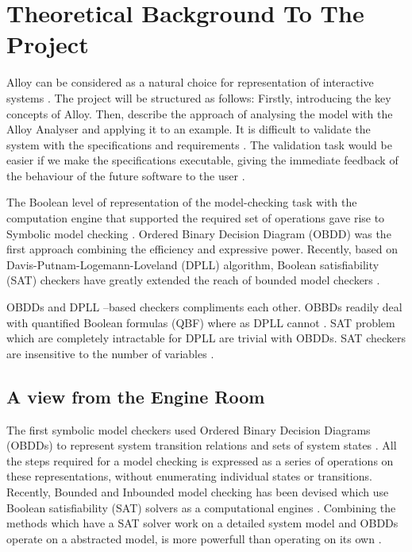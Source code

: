 \documentclass[a4paper,10pt]{report}
\begin{document}
\chapter{Theoretical Background To The Project}
Alloy can be considered as a natural choice for representation of interactive systems \cite{P.Curson}.  The project will be structured as follows:
 Firstly, introducing the key concepts of Alloy. Then, describe the approach of analysing the model with the Alloy Analyser and applying it to an example.
It is difficult to validate the system with the specifications and requirements \cite{Boyatt}. The     validation task would be easier if we make the specifications executable, giving the immediate feedback of the behaviour of the future software to the user \cite{Boyatt}.

The Boolean level of representation of the model-checking task with the computation engine that supported the required set of operations gave rise to Symbolic model checking \cite{Bryant1986}. Ordered Binary Decision Diagram (OBDD) was the first approach combining the efficiency and expressive power. Recently, based on Davis-Putnam-Logemann-Loveland (DPLL) algorithm, Boolean satisfiability (SAT) checkers have greatly extended the reach of bounded model checkers \cite{Bryant1986}.

OBDDs and DPLL –based checkers compliments each other. OBBDs readily deal with quantified Boolean formulas (QBF) where as DPLL cannot \cite{Bryant1986}. SAT problem which are completely intractable for DPLL are trivial with OBDDs. SAT checkers are insensitive to the number of variables \cite{Strichman}.

\section{A view from the Engine Room}
\label{View from engine}

The first symbolic model checkers used Ordered Binary Decision Diagrams (OBDDs) \cite{Bryant1986} to represent system transition relations and sets of system states \cite{McMillan1992} . All the steps required for a model checking is expressed as a series of operations on these representations, without enumerating individual states or transitions. Recently, Bounded and Inbounded model checking has been devised which use Boolean satisfiability (SAT) solvers as a computational engines \cite{McMillan1992}. Combining the methods which have a SAT solver work on a detailed system model and OBDDs operate on a abstracted model, is more powerfull than operating on its own \cite{Clarke1999}.
\end{document}
